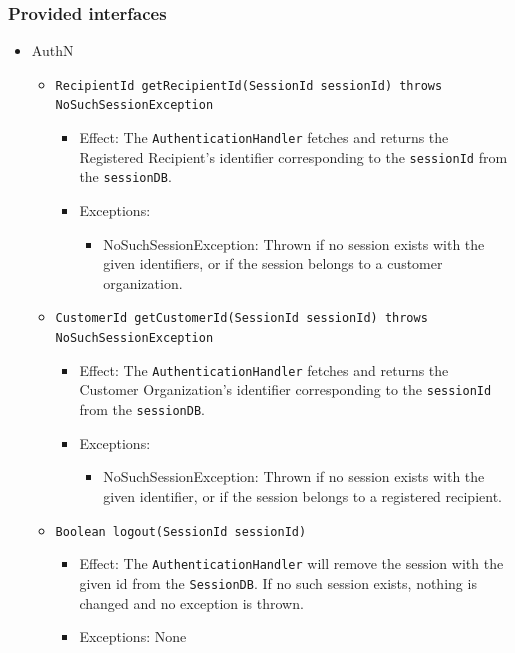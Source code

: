 \documentclass[a4paper,10pt]{article}
\begin{document}
\subsubsection*{Provided interfaces}
\begin{itemize}
    \item AuthN
    \begin{itemize}
        \item \texttt{RecipientId getRecipientId(SessionId sessionId) throws NoSuchSessionException}
        \begin{itemize}
            \item Effect: The \texttt{AuthenticationHandler} fetches and returns the Registered Recipient's identifier corresponding to the \texttt{sessionId} from the \texttt{sessionDB}.
            \item Exceptions:
            \begin{itemize}
                \item NoSuchSessionException: Thrown if no session exists with the given identifiers, or if the session belongs to a customer organization.
            \end{itemize}
		\end{itemize}
		
        \item \texttt{CustomerId getCustomerId(SessionId sessionId) throws NoSuchSessionException}
        \begin{itemize}
             \item Effect: The \texttt{AuthenticationHandler} fetches and returns the Customer Organization's identifier corresponding to the \texttt{sessionId} from the \texttt{sessionDB}.
             \item Exceptions:
             \begin{itemize}
                \item NoSuchSessionException: Thrown if no session exists with the given identifier, or if the session belongs to a registered recipient.
             \end{itemize}
        \end{itemize}
        
        \item \texttt{Boolean logout(SessionId sessionId)}
        \begin{itemize}
            \item Effect: The \texttt{AuthenticationHandler} will remove the session with the given id from the \texttt{SessionDB}. If no such session exists, nothing is changed and no exception is thrown.
            \item Exceptions: None
        \end{itemize}
        

\end{itemize}
\end{itemize}
\end{document}
